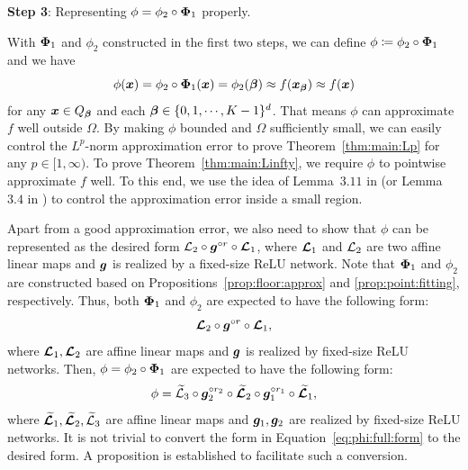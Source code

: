 \documentclass[nohyperref]{article}
\theoremstyle{plain}
\theoremstyle{definition}
\theoremstyle{remark}
\begin{document}
\vspace{4pt}
\textbf{Step 3}: Representing $\phi=\phi_2\circ{\bm{\Phi}}_1$ properly.

With ${\bm{\Phi}}_1$ and $\phi_2$ constructed in the first two steps, we can define $\phi\coloneqq \phi_2\circ {\bm{\Phi}}_1$ and we have
\begin{equation*}
	\phi({\bm{x}})=\phi_2\circ{\bm{\Phi}}_1({\bm{x}})=\phi_2({\bm{\beta}})\approx f({\bm{x}}_{\bm{\beta}})\approx f({\bm{x}})
\end{equation*}
for any ${\bm{x}}\in Q_{\bm{\beta}}$ and each $\bmbeta\in \{0,1,\dotsc,K-1\}^d$.
That means $\phi$ can approximate $f$ well outside $\Omega$. 
By making $\phi$ bounded and $\Omega$ sufficiently small, we can easily control the $L^p$-norm approximation error to prove Theorem~\ref{thm:main:Lp} for any $p\in [1,\infty)$.
To prove Theorem~\ref{thm:main:Linfty}, we require $\phi$ to pointwise approximate $f$ well. To this end, we use the idea of Lemma~$3.11$ in \cite{shijun:thesis} (or Lemma~$3.4$ in \cite{shijun:3}) to control the approximation error inside a small region. 

Apart from a good approximation error, we also need to show 
that $\phi$ can be represented as the desired form 
${\mathcal{L}}_2\circ {\bm{g}}^{\circ r}\circ {\bm{\mathcal{L}}}_1$, where ${\bm{\mathcal{L}}}_1$ and ${\mathcal{L}}_2$ are two affine linear maps and  ${\bm{g}}$ is realized by a fixed-size ReLU network. Note that ${\bm{\Phi}}_1$ and $\phi_2$ are constructed based on Propositions~\ref{prop:floor:approx} and \ref{prop:point:fitting}, respectively. Thus, 
both ${\bm{\Phi}}_1$ and $\phi_2$ are expected to have the following form:
\begin{equation*}
	 {\bm{\mathcal{L}}}_2\circ  {\bm{g}}^{\circ r}\circ {\bm{\mathcal{L}}}_1,
\end{equation*}
where ${\bm{\mathcal{L}}}_1,{\bm{\mathcal{L}}}_2$ are affine linear maps and ${\bm{g}}$ is realized by fixed-size ReLU networks. Then,
$\phi=\phi_2\circ {\bm{\Phi}}_1$ are expected to have the following form:
\begin{equation}
	\label{eq:phi:full:form}
	\phi= {\mathcal{\widetilde{L}}}_3\circ {\bm{g}}_2^{\circ r_2}\circ {\bm{\mathcal{\widetilde{L}}}}_2\circ  {\bm{g}}_1^{\circ r_1}\circ {\bm{\mathcal{\widetilde{L}}}}_1,
\end{equation}
where ${\bm{\mathcal{\widetilde{L}}}}_1,{\bm{\mathcal{\widetilde{L}}}}_2,{\mathcal{\widetilde{L}}}_3$ are affine linear maps and ${\bm{g}}_1,{\bm{g}}_2$ are realized by fixed-size ReLU networks. It is not trivial to convert  the form in Equation~\eqref{eq:phi:full:form} to the desired form.
A proposition is established to facilitate such a conversion. 
\end{document}
